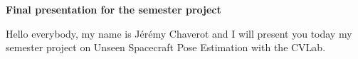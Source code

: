 \documentclass[headsepline,footsepline,footinclude=false,oneside,fontsize=10pt,paper=a4,listof=totoc,bibliography=totoc]{scrbook}
\begin{document}
\begin{center}
	\textbf{Final presentation for the semester project}
\end{center}

\vspace{1cm}

Hello everybody, my name is Jérémy Chaverot and I will present you today my semester project on Unseen Spacecraft Pose Estimation with the CVLab.
\end{document}
